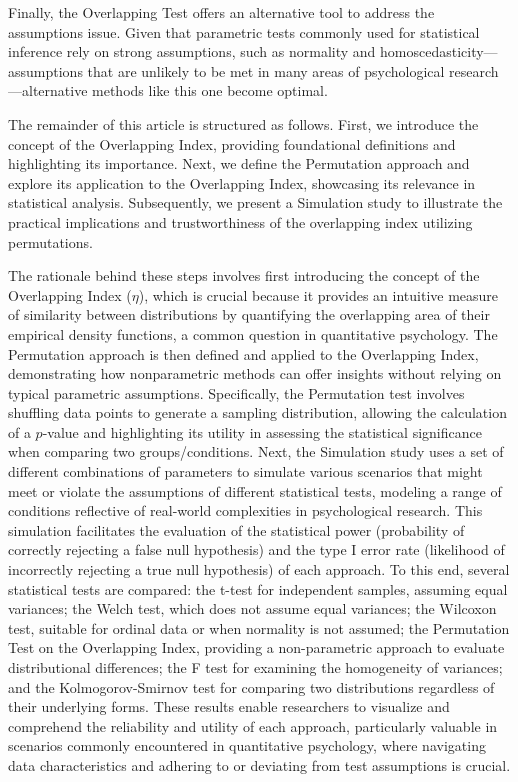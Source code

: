 \documentclass[twocolumn]{article}\usepackage[]{graphicx}\usepackage[]{xcolor}
\begin{document}
Finally, the Overlapping Test offers an alternative tool to address the assumptions issue. Given that parametric tests commonly used for statistical inference rely on strong assumptions, such as normality and homoscedasticity—assumptions that are unlikely to be met in many areas of psychological research—alternative methods like this one become optimal.
%     
% 

\vspace{0.2cm}
The remainder of this article is structured as follows. First, we introduce the concept of the Overlapping Index, providing foundational definitions and highlighting its importance. Next, we define the Permutation approach and explore its application to the Overlapping Index, showcasing its relevance in statistical analysis. Subsequently, we present a Simulation study to illustrate the practical implications and trustworthiness of the overlapping index utilizing permutations.
 

The rationale behind these steps involves first introducing the concept of the Overlapping Index ($\eta$), which is crucial because it provides an intuitive measure of similarity between distributions by quantifying the overlapping area of their empirical density functions, a common question in quantitative psychology. The Permutation approach is then defined and applied to the Overlapping Index, demonstrating how nonparametric methods can offer insights without relying on typical parametric assumptions. Specifically, the Permutation test involves shuffling data points to generate a sampling distribution, allowing the calculation of a $p$-value and highlighting its utility in assessing the statistical significance when comparing two groups/conditions. Next, the Simulation study uses a set of different combinations of parameters to simulate various scenarios that might meet or violate the assumptions of different statistical tests, modeling a range of conditions reflective of real-world complexities in psychological research. This simulation facilitates the evaluation of the statistical power (probability of correctly rejecting a false null hypothesis) and the type I error rate (likelihood of incorrectly rejecting a true null hypothesis) of each approach. To this end, several statistical tests are compared: the t-test for independent samples, assuming equal variances; the Welch test, which does not assume equal variances; the Wilcoxon test, suitable for ordinal data or when normality is not assumed; the Permutation Test on the Overlapping Index, providing a non-parametric approach to evaluate distributional differences; the F test for examining the homogeneity of variances; and the Kolmogorov-Smirnov test for comparing two distributions regardless of their underlying forms. These results enable researchers to visualize and comprehend the reliability and utility of each approach, particularly valuable in scenarios commonly encountered in quantitative psychology, where navigating data characteristics and adhering to or deviating from test assumptions is crucial.
\end{document}
